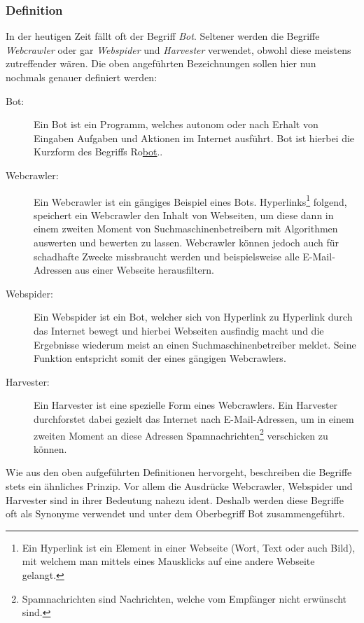 \subsubsection{Definition}
In der heutigen Zeit fällt oft der Begriff \emph{Bot}. Seltener werden die Begriffe \emph{Webcrawler} oder gar \emph{Webspider} und \emph{Harvester} verwendet, obwohl diese meistens zutreffender wären. Die oben angeführten Bezeichnungen sollen hier nun nochmals genauer definiert werden: 
\begin{description}
	\item[Bot:] Ein Bot ist ein Programm, welches autonom oder nach Erhalt von Eingaben Aufgaben und Aktionen im Internet ausführt. Bot ist hierbei die Kurzform des Begriffs Ro\underline{bot}.\cite{def-bot}.
	
	\item[Webcrawler:] Ein Webcrawler ist ein gängiges Beispiel eines Bots. \cite{def-bot} Hyperlinks\footnote{Ein Hyperlink ist ein Element in einer Webseite (Wort, Text oder auch Bild), mit welchem man mittels eines Mausklicks auf eine andere Webseite gelangt.} folgend, speichert ein Webcrawler den Inhalt von Webseiten, um diese dann in einem zweiten Moment von Suchmaschinenbetreibern mit Algorithmen auswerten und bewerten zu lassen.\cite{def-bot} Webcrawler können jedoch auch für schadhafte Zwecke missbraucht werden und beispielsweise alle E-Mail-Adressen aus einer Webseite herausfiltern. 
	
	\item[Webspider:] Ein Webspider ist ein Bot, welcher sich von Hyperlink zu Hyperlink durch das Internet bewegt und hierbei Webseiten ausfindig macht und die Ergebnisse wiederum meist an einen Suchmaschinenbetreiber meldet\cite{def-spider}. Seine Funktion entspricht somit der eines gängigen Webcrawlers.
	
	\item[Harvester:] Ein Harvester ist eine spezielle Form eines Webcrawlers. Ein Harvester durchforstet dabei gezielt das Internet nach E-Mail-Adressen, um in einem zweiten Moment an diese Adressen Spamnachrichten\footnote{Spamnachrichten sind Nachrichten, welche vom Empfänger nicht erwünscht sind.} verschicken zu können.
\end{description}
Wie aus den oben aufgeführten Definitionen hervorgeht, beschreiben die Begriffe stets ein ähnliches Prinzip. Vor allem die Ausdrücke Webcrawler, Webspider und Harvester sind in ihrer Bedeutung nahezu ident. Deshalb werden diese Begriffe oft als Synonyme verwendet und unter dem Oberbegriff Bot zusammengeführt.
\label{subsub:def}